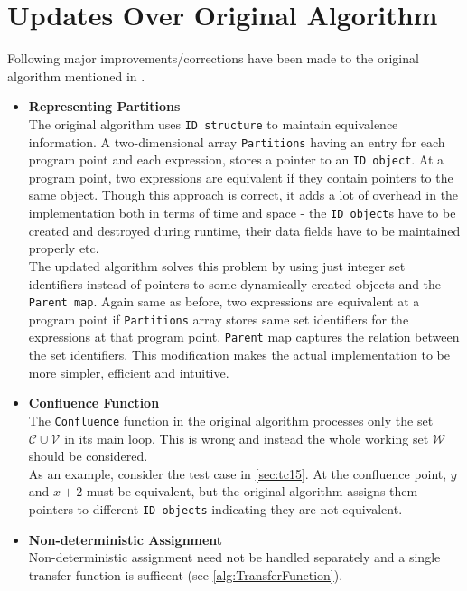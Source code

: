 \section{Updates Over Original Algorithm}
\label{sec:UpdatesOverOriginalAlgorithm}
Following major improvements/corrections have been made to the original algorithm 
mentioned in \cite{Babu}.
\begin{itemize} \tightlist
    \item \textbf{Representing Partitions}\\
    The original algorithm uses \texttt{ID structure} to maintain equivalence information. A two-dimensional array \texttt{Partitions} having an entry for each program point and each expression, stores a pointer to an \texttt{ID object}. At a program point, two expressions are equivalent if they contain pointers to the same object. Though this approach is correct, it adds a lot of overhead in the implementation both in terms of time and space - the \texttt{ID object}s have to be created and destroyed during runtime, their data fields have to be maintained properly etc.\\
    The updated algorithm solves this problem by using just integer set identifiers instead of pointers to some dynamically created objects and the \texttt{Parent map}. Again same as before, two expressions are equivalent at a program point if \texttt{Partitions} array stores same set identifiers for the expressions at that program point. \texttt{Parent} map captures the relation between the set identifiers. This modification makes the actual implementation to be more simpler, efficient and intuitive.
    \item \textbf{Confluence Function}\\
    The \texttt{Confluence} function in the original algorithm processes only the set $\mathcal C \cup \mathcal V$ in its main loop. This is wrong and instead the whole working set $\mathcal W$ should be considered.\\
    As an example, consider the test case in \autoref{sec:tc15}. At the confluence point, $y$ and $x + 2$ must be equivalent, but the original algorithm assigns them pointers to different \texttt{ID objects} indicating they are not equivalent.
    \item \textbf{Non-deterministic Assignment}\\
    Non-deterministic assignment need not be handled separately and a single transfer function is sufficent (see \autoref{alg:TransferFunction}).
\end{itemize}

